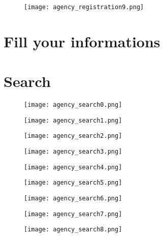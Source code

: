 \documentclass[11 pt, a4paper]{article}
\begin{document}
\begin{figure}[H]
\centering
\texttt{[image: agency\_registration9.png]}
\end{figure}

\section{Fill your informations}

\section{Search}
\begin{figure}[H]
\centering
\texttt{[image: agency\_search0.png]}
\end{figure}


\begin{figure}[H]
\centering
\texttt{[image: agency\_search1.png]}
\end{figure}


\clearpage
\begin{figure}[H]
\centering
\texttt{[image: agency\_search2.png]}
\end{figure}


\begin{figure}[H]
\centering
\texttt{[image: agency\_search3.png]}
\end{figure}


\clearpage
\begin{figure}[H]
\centering
\texttt{[image: agency\_search4.png]}
\end{figure}


\begin{figure}[H]
\centering
\texttt{[image: agency\_search5.png]}
\end{figure}


\clearpage
\begin{figure}[H]
\centering
\texttt{[image: agency\_search6.png]}
\end{figure}


\begin{figure}[H]
\centering
\texttt{[image: agency\_search7.png]}
\end{figure}


\clearpage
\begin{figure}[H]
\centering
\texttt{[image: agency\_search8.png]}
\end{figure}
\end{document}
